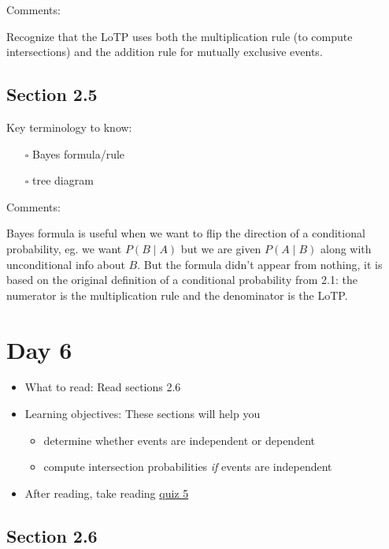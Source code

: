 \documentclass[
  letterpaper,
]{scrbook}
\providecommand{\tightlist}{%
  \setlength{\itemsep}{0pt}\setlength{\parskip}{0pt}}\usepackage{longtable,booktabs,array}
\begin{document}
Comments:

Recognize that the LoTP uses both the multiplication rule (to compute
intersections) and the addition rule for mutually exclusive events.

\subsection*{Section 2.5}\label{section-2.5}

Key terminology to know:

\begin{itemize}
\tightlist
\item[$\square$]
  Bayes formula/rule
\item[$\square$]
  tree diagram
\end{itemize}

Comments:

Bayes formula is useful when we want to flip the direction of a
conditional probability, eg. we want \(P(B \mid A)\) but we are given
\(P(A \mid B)\) along with unconditional info about \(B\). But the
formula didn't appear from nothing, it is based on the original
definition of a conditional probability from 2.1: the numerator is the
multiplication rule and the denominator is the LoTP.

\section*{Day 6}\label{day-6}


\begin{itemize}
\item
  What to read: Read sections 2.6
\item
  Learning objectives: These sections will help you

  \begin{itemize}
  \tightlist
  \item
    determine whether events are independent or dependent
  \item
    compute intersection probabilities \emph{if} events are independent
  \end{itemize}
\item
  After reading, take reading
  \href{https://forms.gle/oXD68yZtkMh7Lxv3A}{quiz 5}
\end{itemize}

\subsection*{Section 2.6}\label{section-2.6}
\end{document}
